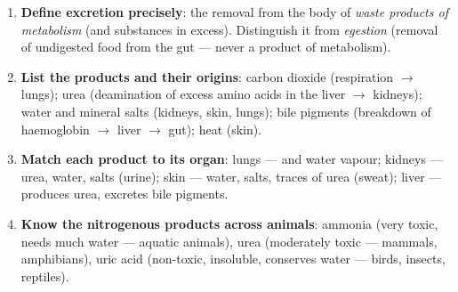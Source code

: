 \documentclass[11pt]{article}
\newcommand{\cle}[1]{{\popxbold\color{popdark}#1}}
\begin{document}
\begin{methode}
\begin{enumerate}
\item \textbf{Define excretion precisely}: the removal from the body of \emph{waste products of metabolism} (and substances in excess). Distinguish it from \emph{egestion} (removal of undigested food from the gut — never a product of metabolism).
\item \textbf{List the products and their origins}: carbon dioxide (respiration $\rightarrow$ lungs); urea (\cle{deamination} of excess amino acids in the liver $\rightarrow$ kidneys); water and mineral salts (kidneys, skin, lungs); bile pigments (breakdown of haemoglobin $\rightarrow$ liver $\rightarrow$ gut); heat (skin).
\item \textbf{Match each product to its organ}: lungs —  and water vapour; kidneys — urea, water, salts (urine); skin — water, salts, traces of urea (sweat); liver — produces urea, excretes bile pigments.
\item \textbf{Know the nitrogenous products across animals}: \cle{ammonia} (very toxic, needs much water — aquatic animals), \cle{urea} (moderately toxic — mammals, amphibians), \cle{uric acid} (non-toxic, insoluble, conserves water — birds, insects, reptiles).
\end{enumerate}
\end{methode}
\end{document}
